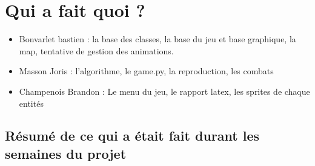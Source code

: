 \documentclass[a4paper, 11pt]{article}
\begin{document}
\section{Qui a fait quoi ?}

\begin{itemize}
\item Bonvarlet bastien : la base des classes, la base du jeu et base graphique, la map, tentative de gestion des animations.\\
\item Masson Joris : l'algorithme, le game.py, la reproduction, les combats\\
\item Champenois Brandon : Le menu du jeu, le rapport latex, les sprites de chaque entités
\end{itemize}

\subsection{Résumé de ce qui a était fait durant les semaines du projet}
\end{document}
